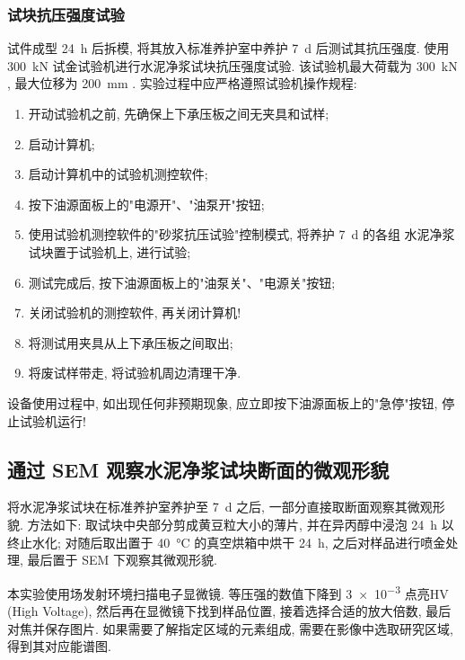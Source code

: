 \subsubsection{试块抗压强度试验}
试件成型 \SI{24}{\hour} 后拆模, 将其放入标准养护室中养护 \SI{7}{\day} 后测试其抗压强度.
使用 \SI{300}{\kilo\newton} 试金试验机进行水泥净浆试块抗压强度试验. 该试验机最大荷载为 \SI{300}{\kilo\newton} , 最大位移为 \SI{200}{\milli\meter} .
实验过程中应严格遵照试验机操作规程:
\begin{enumerate}[wide, labelwidth=!, labelindent=0pt]
  \item 开动试验机之前, 先确保上下承压板之间无夹具和试样;
  \item 启动计算机;
  \item 启动计算机中的试验机测控软件;
  \item 按下油源面板上的"电源开"、"油泵开"按钮;
  \item 使用试验机测控软件的"砂浆抗压试验"控制模式, 将养护 \SI{7}{\day} 的各组  水泥净浆试块置于试验机上, 进行试验;
  \item 测试完成后, 按下油源面板上的"油泵关"、"电源关"按钮;
  \item 关闭试验机的测控软件, 再关闭计算机!
  \item 将测试用夹具从上下承压板之间取出;
  \item 将废试样带走, 将试验机周边清理干净.
\end{enumerate}
设备使用过程中, 如出现任何非预期现象, 应立即按下油源面板上的"急停"按钮, 停止试验机运行!

\subsection{通过 SEM 观察水泥净浆试块断面的微观形貌}

将水泥净浆试块在标准养护室养护至 \SI{7}{\day} 之后, 一部分直接取断面观察其微观形貌.
方法如下: 取试块中央部分剪成黄豆粒大小的薄片, 并在异丙醇中浸泡 \SI{24}{\hour} 以终止水化; 对随后取出置于 \SI{40}{\degreeCelsius} 的真空烘箱中烘干 \SI{24}{\hour}, 之后对样品进行喷金处理, 最后置于 SEM 下观察其微观形貌.

本实验使用场发射环境扫描电子显微镜. 等压强的数值下降到 \num{3e-3} 点亮HV (High Voltage), 然后再在显微镜下找到样品位置, 接着选择合适的放大倍数, 最后对焦并保存图片.
如果需要了解指定区域的元素组成, 需要在影像中选取研究区域, 得到其对应能谱图.

